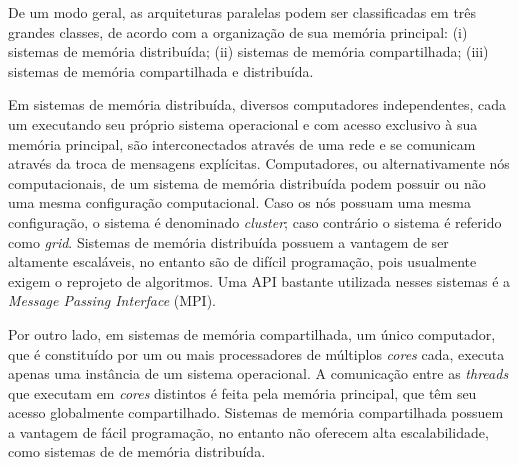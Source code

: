 \documentclass{SBCbookchapter}
\begin{document}
		De um modo geral, as arquiteturas paralelas podem ser
		classificadas em três grandes classes, de acordo com a
		organização de sua memória principal: (i) sistemas de memória
		distribuída; (ii) sistemas de memória compartilhada; (iii)
		sistemas de memória compartilhada e distribuída.
	
		Em sistemas de memória distribuída, diversos computadores
		independentes, cada um executando seu próprio sistema
		operacional e com acesso exclusivo à sua memória principal, são
		interconectados através de uma rede e se comunicam através da
		troca de mensagens explícitas. Computadores, ou alternativamente
		nós computacionais, de um sistema de memória distribuída podem
		possuir ou não uma mesma configuração computacional.  Caso os
		nós possuam uma mesma configuração, o sistema é denominado
		\textit{cluster}; caso contrário o sistema é referido como
		\textit{grid}. Sistemas de memória distribuída possuem a
		vantagem de ser altamente escaláveis, no entanto são de difícil
		programação, pois usualmente exigem o reprojeto de algoritmos.
		Uma API bastante utilizada nesses sistemas é a \textit{Message
		Passing Interface} (MPI).
		
		Por outro lado, em sistemas de memória compartilhada, um único
		computador, que é constituído por um ou mais processadores de
		múltiplos \textit{cores} cada, executa apenas uma instância de
		um sistema operacional. A comunicação entre as \textit{threads}
		que executam em \textit{cores} distintos é feita pela memória
		principal, que têm seu acesso globalmente compartilhado.
		Sistemas de memória compartilhada possuem a vantagem de fácil
		programação, no entanto não oferecem alta escalabilidade, como
		sistemas de de memória distribuída.
\end{document}
